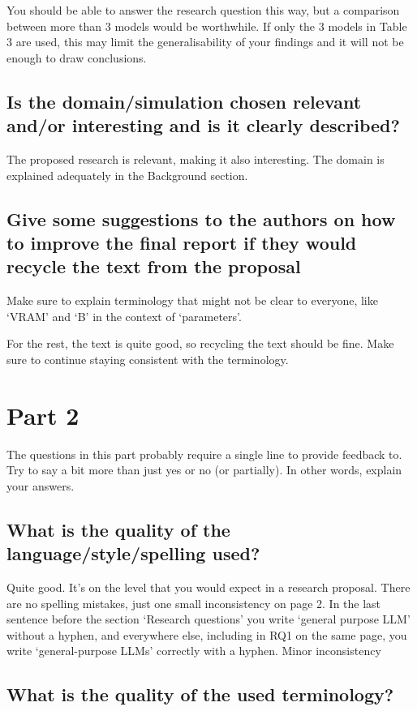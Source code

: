 \documentclass{article}
\begin{document}
You should be able to answer the research question this way, but a comparison between more than 3 models would be worthwhile. If only the 3 models in Table 3 are used, this may limit the generalisability of your findings and it will not be enough to draw conclusions.

\subsection{Is the domain/simulation chosen relevant and/or interesting and is it clearly described?}

The proposed research is relevant, making it also interesting. The domain is explained adequately in the Background section.

\subsection{Give some suggestions to the authors on how to improve the final report if they would recycle the text from the proposal}

Make sure to explain terminology that might not be clear to everyone, like `VRAM' and `B' in the context of `parameters'.

For the rest, the text is quite good, so recycling the text should be fine. Make sure to continue staying consistent with the terminology.


\section{Part 2}

The questions in this part probably require a single line to provide feedback to. Try to say a bit more than just yes or no (or partially). In other words, explain your answers.

\subsection{What is the quality of the language/style/spelling used?}

Quite good. It's on the level that you would expect in a research proposal. There are no spelling mistakes, just one small inconsistency on page 2. In the last sentence before the section `Research questions' you write `general purpose LLM' without a hyphen, and everywhere else, including in RQ1 on the same page, you write `general-purpose LLMs' correctly with a hyphen. Minor inconsistency

\subsection{What is the quality of the used terminology?}
\end{document}

